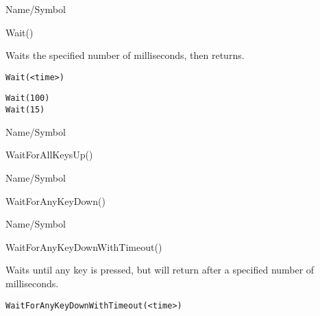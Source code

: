 \rl


\begin{desc}{Name/Symbol}
\item[Name/Symbol]  	Wait() 

\item[Description] 	Waits the specified number of milliseconds, then returns. 

\item[Usage]
\begin{verbatim}
Wait(<time>)
\end{verbatim}

\item[Example]
\begin{verbatim}
Wait(100)
Wait(15)
\end{verbatim}

\item[See Also]	
\end{desc}

\rl


\begin{desc}{Name/Symbol}
\item[Name/Symbol]  	WaitForAllKeysUp()

\item[Description]	

\item[Usage]		

\item[Example]	

\item[See Also]	
\end{desc}

\rl


\begin{desc}{Name/Symbol}
\item[Name/Symbol]  	WaitForAnyKeyDown()

\item[Description]	

\item[Usage]		

\item[Example]	

\item[See Also]	
\end{desc}

\rl


\begin{desc}{Name/Symbol}
\item[Name/Symbol]  	WaitForAnyKeyDownWithTimeout()

\item[Description]  	Waits until any key is pressed, but will return after a 
		specified number of milliseconds.

\item[Usage]
\begin{verbatim}
WaitForAnyKeyDownWithTimeout(<time>)
\end{verbatim}

\item[Example]	

\item[See Also]	
\end{desc}

